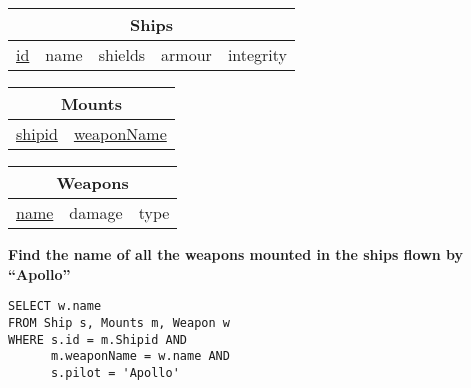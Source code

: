 \documentclass{beamer}
\begin{document}
\begin{frame}[fragile]

\begin{tabular}{|c|c|c|c|c|}
\hline
\multicolumn{5}{|c|}{\textbf{Ships}} \\
\hline
\underline{id} & name & shields & armour & integrity \\
\hline
\end{tabular}

\begin{tabular}{|c|c|}
\hline
\multicolumn{2}{|c|}{\textbf{Mounts}} \\
\hline
\underline{shipid} & \underline{weaponName} \\
\hline
\end{tabular}

\begin{tabular}{|c|c|c|}
\hline
\multicolumn{3}{|c|}{\textbf{Weapons}} \\
\hline
\underline{name} & damage & type \\
\hline
\end{tabular}

\vspace{0.25cm}
\textbf{Find the name of all the weapons mounted in the ships flown by ``Apollo''}

\pause
\begin{lstlisting}[showstringspaces=false]
SELECT w.name
FROM Ship s, Mounts m, Weapon w
WHERE s.id = m.Shipid AND 
      m.weaponName = w.name AND
      s.pilot = 'Apollo'
\end{lstlisting}

\end{frame}
\end{document}
